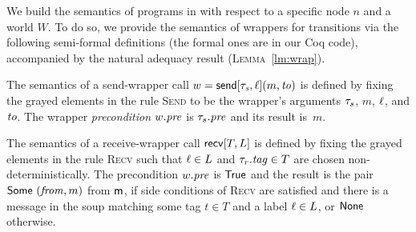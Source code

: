%


We build the semantics of programs in \disel with respect to a
specific node $n$ and a world $W$. To do so, we provide the semantics
of wrappers for transitions via the following semi-formal definitions
(the formal ones are in our Coq code), accompanied by the natural
adequacy result (\textsc{Lemma}~\ref{lm:wrap}).

\begin{definition}
\label{def:swrap}
The semantics of a send-wrapper call
$w =\mathsf{send}[\mathit{\tau_s},\ell](m, \mathit{to})$ is defined by fixing the
grayed elements in the rule \textsc{Send} to be the wrapper's
arguments $\tau_s$, $m$, $\ell$, and $\mathit{to}$. The wrapper
\emph{precondition} $w.\mathit{pre}$ is $\tau_s.\mathit{pre}$ and its result
is~$m$.
\end{definition}

\begin{definition}
\label{def:rwrap}
The semantics of a receive-wrapper call $\mathsf{recv}[T, L]$ is defined by
fixing the grayed elements in the rule \textsc{Recv} such that
$\ell \in L$ and $\tau_r.\mathit{tag} \in T$ are chosen
non-deterministically.
%
The precondition $w.\mathit{pre}$ is $\mathsf{True}$ and the result is the pair
$\mathsf{Some}~(\mathit{from}, m)$ from $\mathsf{m}$, if side conditions of \textsc{Recv}
are satisfied and there is a message in the soup matching some tag
$t \in T$ and a label $\ell \in L$, or $\mathsf{None}$ otherwise.
\end{definition}

